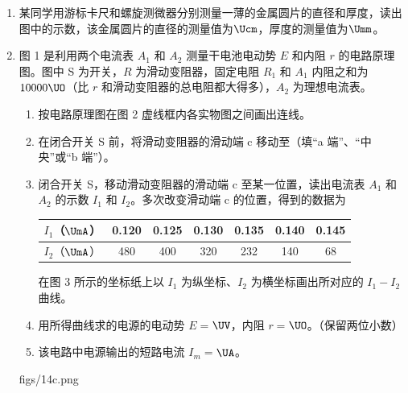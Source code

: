 \documentclass[\gkver]{gaokaozhenti}
\begin{document}
\begin{enumerate}
\item
某同学用游标卡尺和螺旋测微器分别测量一薄的金属圆片的直径和厚度，读出图中的示数，该金属圆片的直径的测量值为$\Ucm$，厚度的测量值为$\Umm$。



\item
图 1 是利用两个电流表 $A_{1}$ 和 $A_{2}$ 测量干电池电动势 $E$ 和内阻 $r$ 的电路原理图。图中 S 为开关，$R$ 为滑动变阻器，固定电阻 $R_{1}$ 和 $A_{1}$ 内阻之和为 $10000\UO$（比 $r$ 和滑动变阻器的总电阻都大得多），$A_{2}$ 为理想电流表。


\begin{enumerate}
	\item
	按电路原理图在图 2 虚线框内各实物图之间画出连线。
	\item
	在闭合开关 S 前，将滑动变阻器的滑动端 c 移动至\tkanswer[2cm]{}（填“a 端”、“中央”或“b 端”）。
	\item
	闭合开关 S，移动滑动变阻器的滑动端 c 至某一位置，读出电流表 $A_{1}$ 和 $A_{2}$ 的示数 $I_{1}$ 和 $I_{2}$。多次改变滑动端 c 的位置，得到的数据为
	\begin{center}
	\begin{tabular}{|c|c|c|c|c|c|c|}
	\hline
	$I_{1}$（$\UmA$） & 0.120 & 0.125 & 0.130 & 0.135 & 0.140 & 0.145 \\
	\hline
	$I_{2}$（$\UmA$） & 480 & 400 & 320 & 232 & 140 & 68 \\
	\hline
	\end{tabular}
	\end{center}

	在图 3 所示的坐标纸上以 $I_{1}$ 为纵坐标、$I_{2}$ 为横坐标画出所对应的 $I_{1}-I_{2}$ 曲线。
	\item
	用所得曲线求的电源的电动势 $E=$\tkanswer[1.5cm]{}$\UV$，内阻 $r=$\tkanswer[1.5cm]{}$\UO$。（保留两位小数）
	\item
	该电路中电源输出的短路电流 $I_{m}=$\tkanswer[1.5cm]{}$\UA$。
\end{enumerate}
{figs/14c.png}


\end{enumerate}
\end{document}
